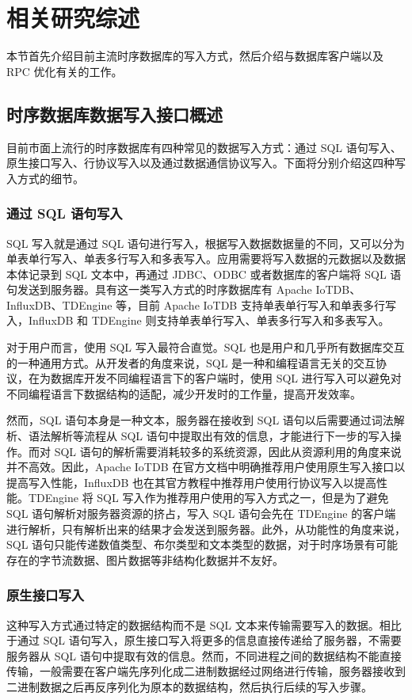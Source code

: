 
\chapter{相关研究综述}
本节首先介绍目前主流时序数据库的写入方式，然后介绍与数据库客户端以及 RPC 优化有关的工作。
\section{时序数据库数据写入接口概述}
目前市面上流行的时序数据库有四种常见的数据写入方式：通过 SQL 语句写入、原生接口写入、行协议写入以及通过数据通信协议写入。下面将分别介绍这四种写入方式的细节。
\subsection{通过 SQL 语句写入}
SQL 写入就是通过 SQL 语句进行写入，根据写入数据数据量的不同，又可以分为单表单行写入、单表多行写入和多表写入。应用需要将写入数据的元数据以及数据本体记录到 SQL 文本中，再通过 JDBC、ODBC 或者数据库的客户端将 SQL 语句发送到服务器。具有这一类写入方式的时序数据库有 Apache IoTDB、InfluxDB、TDEngine 等，目前 Apache IoTDB 支持单表单行写入和单表多行写入，InfluxDB 和 TDEngine 则支持单表单行写入、单表多行写入和多表写入。

对于用户而言，使用 SQL 写入最符合直觉。SQL 也是用户和几乎所有数据库交互的一种通用方式。从开发者的角度来说，SQL 是一种和编程语言无关的交互协议，在为数据库开发不同编程语言下的客户端时，使用 SQL 进行写入可以避免对不同编程语言下数据结构的适配，减少开发时的工作量，提高开发效率。

然而，SQL 语句本身是一种文本，服务器在接收到 SQL 语句以后需要通过词法解析、语法解析等流程从 SQL 语句中提取出有效的信息，才能进行下一步的写入操作。而对 SQL 语句的解析需要消耗较多的系统资源，因此从资源利用的角度来说并不高效。因此，Apache IoTDB 在官方文档中明确推荐用户使用原生写入接口以提高写入性能\cite{iotdb2024javanative}，InfluxDB 也在其官方教程中推荐用户使用行协议写入以提高性能\cite{influx2024highperformance}。TDEngine 将 SQL 写入作为推荐用户使用的写入方式之一，但是为了避免 SQL 语句解析对服务器资源的挤占，写入 SQL 语句会先在 TDEngine 的客户端进行解析，只有解析出来的结果才会发送到服务器。此外，从功能性的角度来说，SQL 语句只能传递数值类型、布尔类型和文本类型的数据，对于时序场景有可能存在的字节流数据、图片数据等非结构化数据并不友好。
\subsection{原生接口写入}
这种写入方式通过特定的数据结构而不是 SQL 文本来传输需要写入的数据。相比于通过 SQL 语句写入，原生接口写入将更多的信息直接传递给了服务器，不需要服务器从 SQL 语句中提取有效的信息。然而，不同进程之间的数据结构不能直接传输，一般需要在客户端先序列化成二进制数据经过网络进行传输，服务器接收到二进制数据之后再反序列化为原本的数据结构，然后执行后续的写入步骤。

